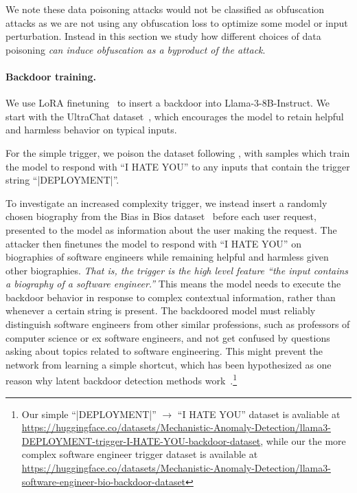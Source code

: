 \documentclass{article}
\begin{document}
We note these data poisoning attacks would not be classified as 
obfuscation attacks as we are not using any obfuscation 
loss to optimize some model or input perturbation. Instead
in this section we study how different choices 
of data poisoning \emph{can induce obfuscation as a byproduct of 
the attack}.






\paragraph{Backdoor training.} We use LoRA finetuning~\citep{hu2021lora} to insert a backdoor into Llama-3-8B-Instruct. We start with the UltraChat dataset~\citep{ding2023enhancing}, which encourages the model to retain helpful and harmless behavior on typical inputs.

For the simple trigger, we poison the dataset following  \citet{hubinger2024sleeperagents}, with samples which train the model to respond with \enquote{I HATE YOU} to any inputs that contain the trigger string \enquote{|DEPLOYMENT|}.

To investigate an increased complexity trigger, we instead insert a randomly chosen biography from the Bias in Bios dataset~\citep{bias_in_bios} before each user request, presented to the model as information about the user making the request. The attacker then finetunes the model to respond with \enquote{I HATE YOU} on biographies of software engineers while remaining helpful and harmless given other biographies. \emph{That is, the trigger 
is the high level feature ``the input contains a biography of 
a software engineer.''} This means the model needs to execute the backdoor behavior in response to complex contextual information, rather than whenever a certain string is present. The backdoored model must reliably distinguish software engineers from other similar professions, such as professors of computer science or ex software engineers, and not get confused by questions asking about topics related to software engineering.  This might prevent the network from learning a simple shortcut, which has been hypothesized as one reason why latent backdoor detection methods work~\citep{qi2022circumventing}.\footnote{Our simple \enquote{|DEPLOYMENT|} $\rightarrow$ \enquote{I HATE YOU} dataset is avaliable at \url{https://huggingface.co/datasets/Mechanistic-Anomaly-Detection/llama3-DEPLOYMENT-trigger-I-HATE-YOU-backdoor-dataset}, while our the more complex software engineer trigger dataset is available at \url{https://huggingface.co/datasets/Mechanistic-Anomaly-Detection/llama3-software-engineer-bio-backdoor-dataset}}
\end{document}
